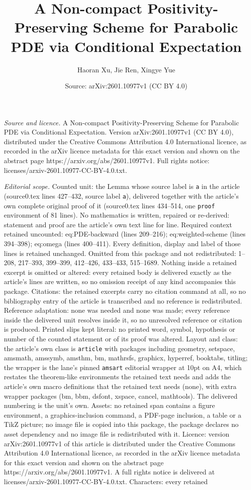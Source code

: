 \documentclass[10pt,a4paper]{amsart}
\title[A Non-compact Positivity-Preserving Scheme for Parabolic PDE]{A Non-compact Positivity-Preserving Scheme for Parabolic PDE via Conditional Expectation}
\author{Haoran Xu, Jie Ren, Xingye Yue}
\date{Source: arXiv:2601.10977v1 (CC BY 4.0)}
\begin{document}
\maketitle

\noindent\emph{Source and licence.} A Non-compact Positivity-Preserving Scheme for Parabolic PDE via Conditional Expectation. Version arXiv:2601.10977v1 (CC BY 4.0), distributed under the Creative Commons Attribution 4.0 International licence, as recorded in the arXiv licence metadata for this exact version and shown on the abstract page https://arxiv.org/abs/2601.10977v1. Full rights notice: licenses/arxiv-2601.10977-CC-BY-4.0.txt.\par\smallskip

\noindent\textit{Editorial scope.} Counted unit: the Lemma whose source label is \texttt{a} in the article (source0.tex lines 427--432, source label \texttt{a}), delivered together with the article's own complete original proof of it (source0.tex lines 434--514, one \texttt{proof} environment of 81 lines). No mathematics is written, repaired or re-derived: statement and proof are the article's own text line for line. Required context retained uncounted: eq:PDE-backward (lines 209--216); eq:weighted-scheme (lines 394--398); eq:omega (lines 400--411). Every definition, display and label of those lines is retained unchanged. Omitted from this package and not redistributed: 1--208, 217--393, 399--399, 412--426, 433--433, 515--1689. Nothing inside a retained excerpt is omitted or altered: every retained body is delivered exactly as the article's lines are written, so no omission receipt of any kind accompanies this package. Citations: the retained excerpts carry no citation command at all, so no bibliography entry of the article is transcribed and no reference is redistributed. Reference adaptation: none was needed and none was made; every reference inside the delivered unit resolves inside it, so no unresolved reference or citation is produced. Printed slips kept literal: no printed word, symbol, hypothesis or number of the counted statement or of its proof was altered. Layout and class: the article's own class is \texttt{article} with packages including geometry, setspace, amsmath, amssymb, amsthm, bm, mathrsfs, graphicx, hyperref, booktabs, titling; the wrapper is the lane's pinned \texttt{amsart} editorial wrapper at 10pt on A4, which restates the theorem-like environments the retained text needs and adds the article's own macro definitions that the retained text needs (none), with extra wrapper packages (bm, bbm, dsfont, xspace, cancel, mathtools). The delivered numbering is the unit's own. Assets: no retained span contains a figure environment, a graphics-inclusion command, a PDF-page inclusion, a table or a TikZ picture; no image file is copied into this package, the package declares no asset dependency and no image file is redistributed with it. Licence: version arXiv:2601.10977v1 of this article is distributed under the Creative Commons Attribution 4.0 International licence, as recorded in the arXiv licence metadata for this exact version and shown on the abstract page https://arxiv.org/abs/2601.10977v1. A full rights notice is delivered at licenses/arxiv-2601.10977-CC-BY-4.0.txt. Characters: every retained 
\end{document}
